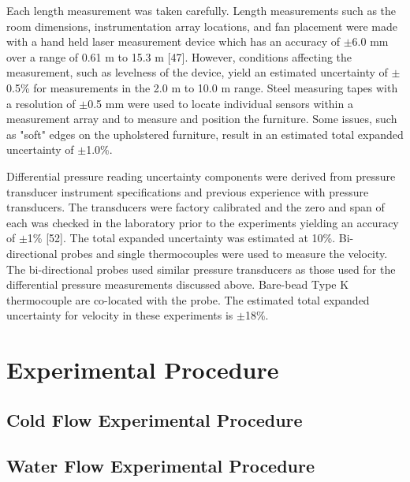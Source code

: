 \documentclass[12pt,oneside]{book}
\begin{document}
Each length measurement was taken carefully. Length measurements such as the room dimensions,
instrumentation array locations, and fan placement were made with a hand held laser measurement
device which has an accuracy of $\pm$6.0 mm over a range of 0.61 m to 15.3 m [47]. However, conditions affecting the measurement, such as levelness of the device, yield an
estimated uncertainty of $\pm$0.5\% for measurements in the 2.0 m to 10.0 m range. Steel measuring tapes with a resolution of $\pm$0.5 mm were used to locate individual sensors within a measurement array and to measure and position the furniture. Some issues, such as "soft" edges on the upholstered furniture, result in an estimated total expanded uncertainty of $\pm$1.0\%. 

Differential pressure reading uncertainty components were derived from pressure transducer instrument specifications and previous experience with pressure transducers. The transducers were factory calibrated and the zero and span of each was checked in the laboratory prior to the experiments yielding an accuracy of $\pm$1\% [52]. The total expanded uncertainty was estimated at 10\%. Bi-directional probes and single thermocouples were used to measure the velocity. The bi-directional probes used similar pressure transducers as those used for the differential pressure measurements discussed above. Bare-bead Type K thermocouple are co-located with the probe. The estimated total expanded uncertainty for velocity in these experiments is $\pm$18\%. 


\section{Experimental Procedure}
\label{sec:Experimental_Procedure}

\subsection{Cold Flow Experimental Procedure}
\label{sec:Cold_Flow_Procedure}

\subsection{Water Flow Experimental Procedure}
\label{sec:Water_Flow_Procedure}
\end{document}

